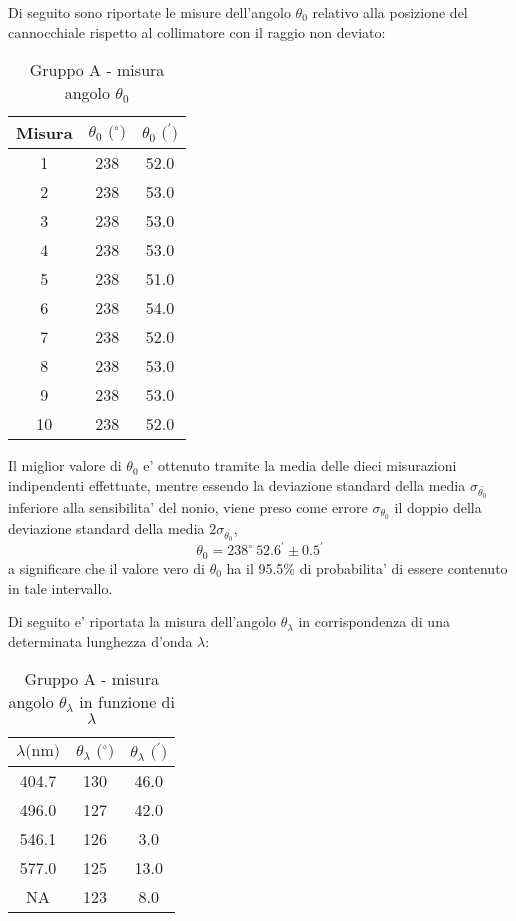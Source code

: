 Di seguito sono riportate le misure dell'angolo $\theta_0$ relativo alla posizione del cannocchiale rispetto al collimatore con il raggio non deviato:
\begin{table}[!htbp]
    {\par\centering
    \begin{tabular}{ccc}
        \hline
        Misura & $\theta_0 \text{ ($^{\circ}$)}$ & $\theta_0 \text{ ($^{\prime}$)}$ \\
        \hline
        1   &   238 &   52.0\\
        2   &   238 &   53.0\\
        3   &   238 &   53.0\\
        4   &   238 &   53.0\\
        5   &   238 &   51.0\\
        6   &   238 &   54.0\\
        7   &   238 &   52.0\\
        8   &   238 &   53.0\\
        9   &   238 &   53.0\\
        10  &   238 &   52.0\\
        \hline
    \end{tabular}
    \par}
    \caption{Gruppo A - misura angolo $\theta_0$}
\end{table}

Il miglior valore di $\theta_0$ e' ottenuto tramite la media delle dieci misurazioni indipendenti effettuate, mentre essendo la deviazione standard della media $\sigma_{\bar{\theta_0}}$ inferiore alla sensibilita' del nonio, viene preso come errore $\sigma_{\theta_0}$ il doppio della deviazione standard della media $2\sigma_{\bar{\theta_0}}$,
\[
    \theta_0 = 238^{\circ} \ 52.6^{\prime} \pm 0.5^{\prime}
\]
a significare che il valore vero di $\theta_0$ ha il 95.5\% di probabilita' di essere contenuto in tale intervallo.

Di seguito e' riportata la misura dell'angolo $\theta_{\lambda}$ in corrispondenza di una determinata lunghezza d'onda $\lambda$:
\begin{table}[!htbp]
    {\par\centering
    \begin{tabular}{ccc}
        \hline
        $\lambda \text{(nm)}$ & $\theta_{\lambda} \text{ ($^{\circ}$)}$ & $\theta_{\lambda} \text{ ($^{\prime}$)}$ \\
        \hline
        404.7   &   130 &   46.0\\
        496.0   &   127 &   42.0\\
        546.1   &   126 &   3.0\\
        577.0   &   125 &   13.0\\
        NA   &   123 &   8.0\\
        \hline
    \end{tabular}
    \par}
    \caption{Gruppo A - misura angolo $\theta_{\lambda}$ in funzione di $\lambda$}
\end{table}

